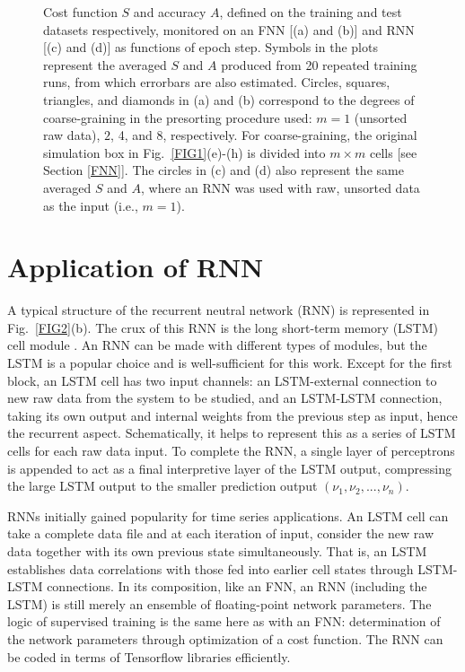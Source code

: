 \begin{figure}[]
\begin{minipage}[t]{\columnwidth}
	\end{minipage}
	\caption{Cost function $S$ and accuracy $A$, defined on the training and test datasets respectively, monitored on an FNN [(a) and (b)] and RNN [(c) and (d)] as functions of epoch step. Symbols in the plots represent the averaged $S$ and $A$ produced from 20 repeated training runs, from which errorbars are also estimated. Circles, squares, triangles, and diamonds in (a) and (b) correspond to the degrees of coarse-graining in the presorting procedure used: $m=1$ (unsorted raw data), $2$, 4, and 8, respectively. For coarse-graining, the original simulation box in Fig.\ \ref{FIG1}(e)-(h) is divided into $m\times m$ cells [see Section \ref{FNN}]. The circles in (c) and (d) also represent the same averaged $S$ and $A$, where an RNN was used with raw, unsorted data as the input (i.e., $m=1$).
	}
	\label{xtud-all}
\end{figure}


\section{Application of RNN}\label{RNN}

A typical structure of the recurrent neutral network (RNN) is represented in Fig.~\ref{FIG2}(b). The crux of this RNN is the long short-term memory (LSTM) cell module \cite{lstm}. An RNN can be made with different types of modules, but the LSTM is a popular choice and is well-sufficient for this work. Except for the first block, an LSTM cell has two input channels: an LSTM-external connection
to new raw data from the system to be studied,
and an LSTM-LSTM connection, taking its own output and internal weights from the previous step as input, hence the recurrent aspect. Schematically, it helps to represent this as a series of LSTM cells for each raw data input.
To complete the RNN, a single layer of perceptrons is appended to act as
a final interpretive layer of the LSTM output, compressing the large LSTM output to the smaller prediction output $(\nu_1, \nu_2, ..., \nu_n)$.

RNNs initially gained popularity for time series applications. An LSTM cell can take a complete data file and at each iteration of input, consider the new raw data together with its own previous state simultaneously. That is, an LSTM establishes data correlations with those fed into earlier cell states through LSTM-LSTM connections.
In its composition, like an FNN, an RNN (including the LSTM) is still merely an ensemble of floating-point network parameters.
The logic of supervised training is the same here as with an FNN: determination of the network parameters through optimization of a cost function. The RNN can be coded in terms of Tensorflow libraries efficiently.


